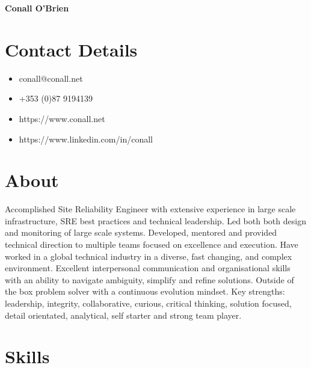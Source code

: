 \documentclass[a4paper, 10pt] {article}
\begin{document}
\begingroup
  \centering
  \LARGE \textbf{Conall O'Brien}\\[1.5em]
\endgroup

\hrulefill

\section*{Contact Details}

\begin{multicols}{2}

  \begin{itemize}
    \item conall@conall.net
    \item +353 (0)87 9194139
    \item https://www.conall.net
    \item https://www.linkedin.com/in/conall
  \end{itemize}

\end{multicols}

\hrulefill

\section*{About}

Accomplished Site Reliability Engineer with extensive experience in
large scale infrastructure, SRE best practices and technical leadership.
Led both both design and monitoring of large scale systems.
Developed, mentored and provided technical direction to multiple teams
focused on excellence and execution. Have worked in a global technical
industry in a diverse, fast changing, and complex environment. Excellent
interpersonal communication and organisational skills with an ability to
navigate ambiguity, simplify and refine solutions. Outside of the box
problem solver with a continuous evolution mindset. Key strengths:
leadership, integrity, collaborative, curious, critical thinking, solution
focused, detail orientated, analytical, self starter and strong team player.

\section*{Skills}
\end{document}
